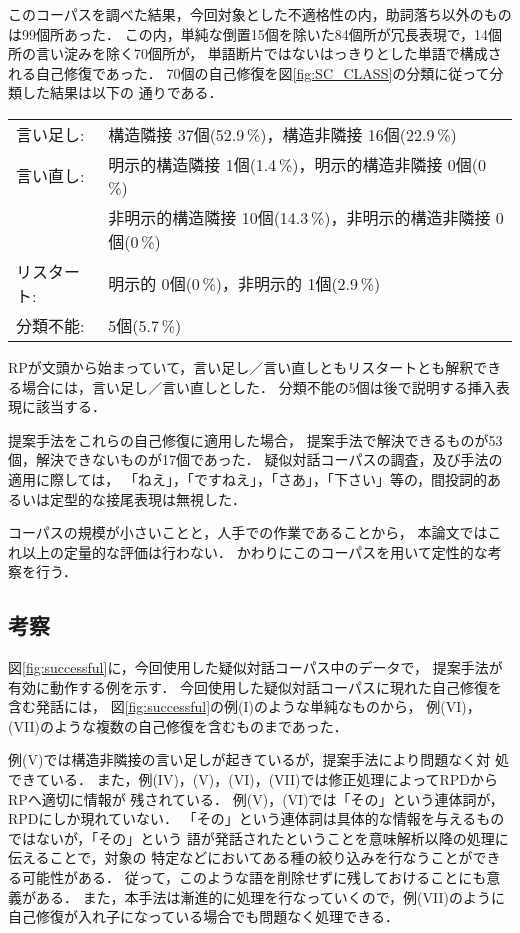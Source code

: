 このコーパスを調べた結果，今回対象とした不適格性の内，助詞落ち以外のものは99個所あった．
この内，単純な倒置15個を除いた84個所が冗長表現で，14個所の言い淀みを除く70個所が，
単語断片ではないはっきりとした単語で構成される自己修復であった．
70個の自己修復を図\ref{fig:SC_CLASS}の分類に従って分類した結果は以下の
通りである．
\begin{center}
\begin{tabular}{ll}
  言い足し: & 構造隣接 37個(52.9\,\%)，構造非隣接 16個(22.9\,\%) \\
  言い直し: & 明示的構造隣接 1個(1.4\,\%)，明示的構造非隣接 0個(0\,\%) \\
            & 非明示的構造隣接 10個(14.3\,\%)，非明示的構造非隣接 0個(0\,\%) \\
  リスタート: & 明示的 0個(0\,\%)，非明示的 1個(2.9\,\%) \\
  分類不能: & 5個(5.7\,\%) \\
\end{tabular}
\end{center}
RPが文頭から始まっていて，言い足し／言い直しともリスタートとも解釈でき
る場合には，言い足し／言い直しとした．
分類不能の5個は後で説明する挿入表現に該当する．

提案手法をこれらの自己修復に適用した場合，
提案手法で解決できるものが53個，解決できないものが17個であった．
疑似対話コーパスの調査，及び手法の適用に際しては，
「ねえ」，「ですねえ」，「さあ」，「下さい」等の，間投詞的あるいは定型的な接尾表現は無視した．

コーパスの規模が小さいことと，人手での作業であることから，
本論文ではこれ以上の定量的な評価は行わない．
かわりにこのコーパスを用いて定性的な考察を行う．

\subsection{考察}

図\ref{fig:successful}に，今回使用した疑似対話コーパス中のデータで，
提案手法が有効に動作する例を示す．
今回使用した疑似対話コーパスに現れた自己修復を含む発話には，
図\ref{fig:successful}の例(I)のような単純なものから，
例(VI)，(VII)のような複数の自己修復を含むものまであった．

例(V)では構造非隣接の言い足しが起きているが，提案手法により問題なく対
処できている．
また，例(IV)，(V)，(VI)，(VII)では修正処理によってRPDからRPへ適切に情報が
残されている．
例(V)，(VI)では「その」という連体詞が，RPDにしか現れていない．
「その」という連体詞は具体的な情報を与えるものではないが，「その」という
語が発話されたということを意味解析以降の処理に伝えることで，対象の
特定などにおいてある種の絞り込みを行なうことができる可能性がある．
従って，このような語を削除せずに残しておけることにも意義がある．
また，本手法は漸進的に処理を行なっていくので，例(VII)のように
自己修復が入れ子になっている場合でも問題なく処理できる．

